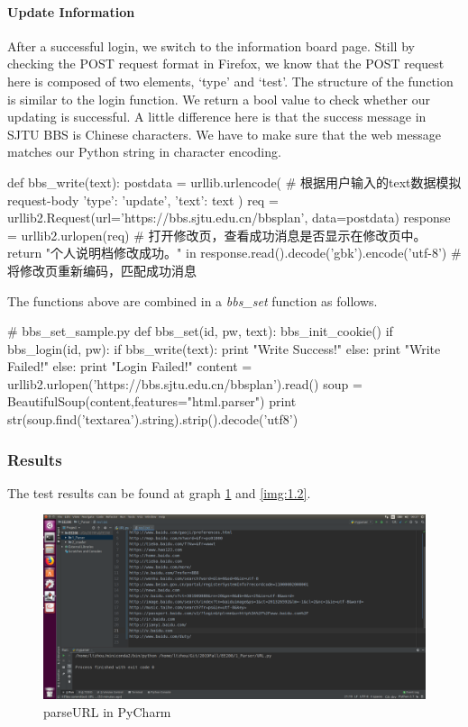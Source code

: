 \documentclass{article}
\begin{document}
\paragraph{Update Information}
After a successful login, we switch to the information board page. Still by checking the POST request format in Firefox, we know that the POST request here is composed of two elements, `type' and `test'. The structure of the function is similar to the login function. We return a bool value to check whether our updating is successful. A little difference here is that the success message in SJTU BBS is Chinese characters. We have to make sure that the web message matches our Python string in character encoding.

\begin{python}
def bbs_write(text):
    postdata = urllib.urlencode({    # 根据用户输入的text数据模拟request-body
        'type': 'update',
        'text': text
    })
    req = urllib2.Request(url='https://bbs.sjtu.edu.cn/bbsplan', data=postdata)
    response = urllib2.urlopen(req)  # 打开修改页，查看成功消息是否显示在修改页中。
    return "个人说明档修改成功。" in response.read().decode('gbk').encode('utf-8')
                                     # 将修改页重新编码，匹配成功消息
\end{python}

The functions above are combined in a \textit{bbs\_set} function as follows.
\begin{python}
# bbs_set_sample.py
def bbs_set(id, pw, text):
    bbs_init_cookie()
    if bbs_login(id, pw):
        if bbs_write(text):
            print "Write Success!"
        else:
            print "Write Failed!"
    else:
        print "Login Failed!"
    content = urllib2.urlopen('https://bbs.sjtu.edu.cn/bbsplan').read()
    soup = BeautifulSoup(content,features="html.parser")
    print str(soup.find('textarea').string).strip().decode('utf8')
\end{python}

\subsubsection{Results}
The test results can be found at graph \ref{img:1.1} and \ref{img:1.2}.

\begin{figure}[htbp]
\centering
\includegraphics[width=13.5cm]{img/test1_1.png}
\caption{parseURL in PyCharm}
\label{img:1.1}
\end{figure}
\end{document}
